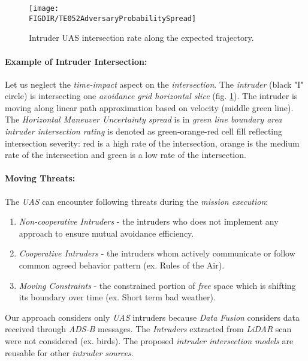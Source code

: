  

\begin{figure}[H]
    \centering
    \texttt{[image: \\FIGDIR/TE052AdversaryProbabilitySpread]}
    \caption{Intruder UAS intersection rate along the expected trajectory.}
    \label{fig:intruderProbabiltySpreadTheoretical}
\end{figure}   

\paragraph{Example of Intruder Intersection:} Let us neglect the \emph{time-impact} aspect on the \emph{intersection}.  The \emph{intruder} (black "I" circle) is intersecting one \emph{avoidance grid horizontal slice} (fig. \ref{fig:intruderProbabiltySpreadTheoretical}).  The intruder is moving along linear path approximation based on velocity (middle green line). The \emph{Horizontal Maneuver Uncertainty spread} is in \emph{green line boundary area} \emph{intruder intersection rating} is denoted as green-orange-red cell fill reflecting intersection severity:  red is a high rate of the intersection, orange is the medium rate of the intersection and green is a low rate of the intersection.
    


\paragraph{Moving Threats:} The \emph{UAS} can encounter following threats during the \emph{mission execution}:
\begin{enumerate}
    \item \emph{Non-cooperative Intruders} - the intruders who does not implement any approach to ensure mutual avoidance efficiency.
    
    \item \emph{Cooperative Intruders} - the intruders whom actively communicate or follow common agreed behavior pattern (ex. Rules of the Air).
    
    \item \emph{Moving Constraints} - the constrained portion of \emph{free} space which is shifting its boundary over time (ex. Short term bad weather).
\end{enumerate}
    
\begin{note}
    Our approach considers only \emph{UAS} intruders because \emph{Data Fusion} considers data received through \emph{ADS-B} messages. The \emph{Intruders} extracted from \emph{LiDAR} scan were not considered (ex. birds). The proposed \emph{intruder intersection models} are reusable for other \emph{intruder sources}.
\end{note}

